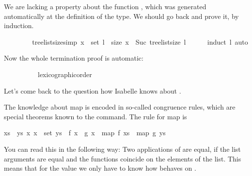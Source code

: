 \begin{isabellebody}
\begin{isamarkuptxt}
      We are lacking a property about the function , which was generated automatically at the
      definition of the  type. We should go back and prove
      it, by induction.%
\end{isamarkuptxt}%
\isamarkuptrue%
\ \ \ \ \isamarkupfalse%
%
\endisatagproof
{\isafoldproof}%
%
\isadelimproof
%
\endisadelimproof
\isanewline
\isanewline
\ \ \isamarkupfalse%
\ tree{\isacharunderscore}list{\isacharunderscore}size{\isacharbrackleft}simp{\isacharbrackright}{\isacharcolon}\ {\isachardoublequoteopen}x\ {\isasymin}\ set\ l\ {\isasymLongrightarrow}\ size\ x\ {\isacharless}\ Suc\ {\isacharparenleft}tree{\isacharunderscore}list{\isacharunderscore}size\ l{\isacharparenright}{\isachardoublequoteclose}\isanewline
%
\isadelimproof
\ \ \ \ %
\endisadelimproof
%
\isatagproof
{}\isamarkupfalse%
\ {\isacharparenleft}induct\ l{\isacharparenright}\ auto%
\endisatagproof
{\isafoldproof}%
%
\isadelimproof
%
\endisadelimproof
%
\begin{isamarkuptext}%
Now the whole termination proof is automatic:%
\end{isamarkuptext}%
\isamarkuptrue%
\ \ \isamarkupfalse%
\ \isanewline
%
\isadelimproof
\ \ \ \ %
\endisadelimproof
%
\isatagproof
{}\isamarkupfalse%
\ lexicographic{\isacharunderscore}order%
\endisatagproof
{\isafoldproof}%
%
\isadelimproof
%
\endisadelimproof
%
\isamarkuptrue%
%
\begin{isamarkuptext}%
Let's come back to the question how Isabelle knows about .

  The knowledge about map is encoded in so-called congruence rules,
  which are special theorems known to the  command. The
  rule for map is

  \begin{isabelle}%
{\isasymlbrakk}{\isacharquery}xs\ {\isacharequal}\ {\isacharquery}ys{\isacharsemicolon}\ {\isasymAnd}x{\isachardot}\ x\ {\isasymin}\ set\ {\isacharquery}ys\ {\isasymLongrightarrow}\ {\isacharquery}f\ x\ {\isacharequal}\ {\isacharquery}g\ x{\isasymrbrakk}\ {\isasymLongrightarrow}\ map\ {\isacharquery}f\ {\isacharquery}xs\ {\isacharequal}\ map\ {\isacharquery}g\ {\isacharquery}ys%
\end{isabelle}

  You can read this in the following way: Two applications of  are equal, if the list arguments are equal and the functions
  coincide on the elements of the list. This means that for the value 
   we only have to know how  behaves on
  .


\end{isamarkuptext}
\end{isabellebody}

